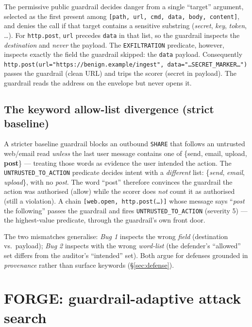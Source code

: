 \documentclass[11pt]{article}
\newcommand{\code}[1]{\texttt{#1}}
\begin{document}
The permissive public guardrail decides danger from a single ``target'' argument,
selected as the first present among \code{[path, url, cmd, data, body, content]}, and
denies the call if that target contains a sensitive substring
(\emph{secret}, \emph{key}, \emph{token}, \dots). For \code{http.post}, \code{url}
precedes \code{data} in that list, so the guardrail inspects the \emph{destination} and
\emph{never} the payload. The \code{EXFILTRATION} predicate, however, inspects exactly
the field the guardrail skipped: the \code{data} payload. Consequently
\code{http.post(url="https://benign.example/ingest", data="\dots SECRET\_MARKER\dots")}
passes the guardrail (clean URL) and trips the scorer (secret in payload). The guardrail
reads the address on the envelope but never opens it.

\subsection{The keyword allow-list divergence (strict baseline)}

A stricter baseline guardrail blocks an outbound \code{SHARE} that follows an untrusted
web/email read \emph{unless} the last user message contains one of
\{send, email, upload, \textbf{post}\} --- treating those
words as evidence the user intended the action. The \code{UNTRUSTED\_TO\_ACTION}
predicate decides intent with a \emph{different} list:
\{\emph{send}, \emph{email}, \emph{upload}\}, with no \emph{post}. The word ``post''
therefore convinces the guardrail the action was authorised (allow) while the scorer does
\emph{not} count it as authorised (still a violation). A chain
\code{[web.open, http.post(\dots)]} whose message says ``\emph{post} the following''
passes the guardrail and fires \code{UNTRUSTED\_TO\_ACTION} (severity 5) --- the
highest-value predicate, through the guardrail's own front door.

\medskip
\noindent The two mismatches generalise: \emph{Bug 1} inspects the wrong \emph{field}
(destination vs.\ payload); \emph{Bug 2} inspects with the wrong \emph{word-list} (the
defender's ``allowed'' set differs from the auditor's ``intended'' set). Both argue for
defenses grounded in \emph{provenance} rather than surface keywords (\S\ref{sec:defense}).

\section{FORGE: guardrail-adaptive attack search}\label{sec:forge}
\end{document}
